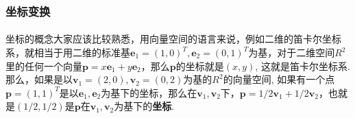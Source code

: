 \subsubsection{坐标变换}
\paragraph{}
坐标的概念大家应该比较熟悉，用向量空间的语言来说，例如二维的笛卡尔坐标系，就相当于用二维的标准基$\textbf{e}_1 = (1, 0)^T, \textbf{e}_2 = (0, 1)^T$为基，对于二维空间$R^2$里的任何一个向量$\textbf{p} = x \textbf{e}_1 + y \textbf{e}_2$，那么$\textbf{p}$的坐标就是$(x, y)$, 这就是笛卡尔坐标系. 那么，如果是以$\textbf{v}_1 = (2, 0), \textbf{v}_2 = (0, 2)$为基的$R^2$的向量空间, 如果有一个点$\textbf{p} = (1, 1)^T$是以$\textbf{e}_1, \textbf{e}_2$为基下的坐标，那么在$\textbf{v}_1, \textbf{v}_2$下，$\textbf{p} = 1/2 \textbf{v}_1 + 1/2 \textbf{v}_2$，也就是$(1/2, 1/2)$是$\textbf{p}$在$\textbf{v}_1, \textbf{v}_2$为基下的\textbf{坐标}.


